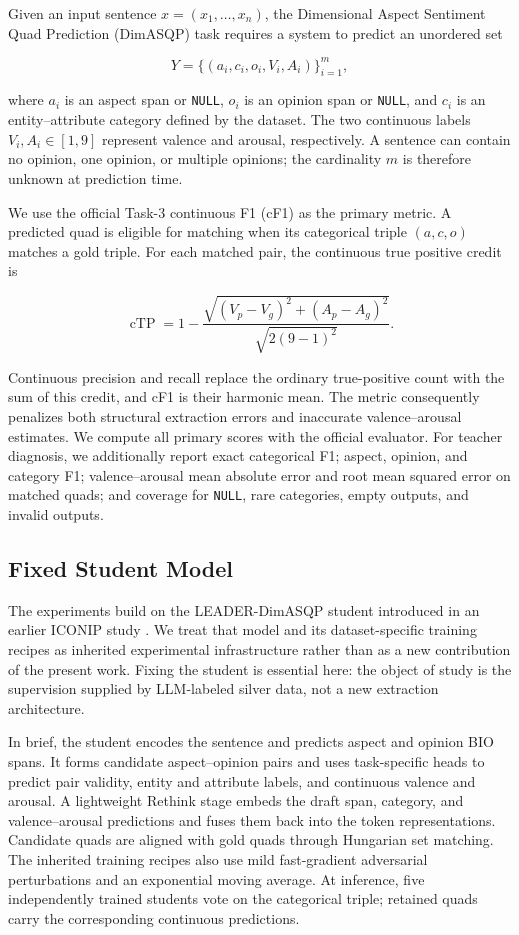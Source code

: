 Given an input sentence \(x=(x_1,\ldots,x_n)\), the Dimensional Aspect
Sentiment Quad Prediction (DimASQP) task requires a system to predict an
unordered set

\[
Y=\{(a_i,c_i,o_i,V_i,A_i)\}_{i=1}^{m},
\]

where \(a_i\) is an aspect span or \texttt{NULL}, \(o_i\) is an opinion
span or \texttt{NULL}, and \(c_i\) is an entity--attribute category
defined by the dataset. The two continuous labels \(V_i,A_i\in[1,9]\)
represent valence and arousal, respectively. A sentence can contain no
opinion, one opinion, or multiple opinions; the cardinality \(m\) is
therefore unknown at prediction time.
\citep{lee2026dimabsa,yu2026semeval}

We use the official Task-3 continuous F1 (cF1) as the primary metric. A
predicted quad is eligible for matching when its categorical triple
\((a,c,o)\) matches a gold triple. For each matched pair, the continuous
true positive credit is

\[
\operatorname{cTP}
=1-\frac{\sqrt{(V_p-V_g)^2+(A_p-A_g)^2}}{\sqrt{2(9-1)^2}}.
\]

Continuous precision and recall replace the ordinary true-positive count
with the sum of this credit, and cF1 is their harmonic mean. The metric
consequently penalizes both structural extraction errors and inaccurate
valence--arousal estimates. We compute all primary scores with the
official evaluator. For teacher diagnosis, we additionally report exact
categorical F1; aspect, opinion, and category F1; valence--arousal mean
absolute error and root mean squared error on matched quads; and
coverage for \texttt{NULL}, rare categories, empty outputs, and invalid
outputs.

\subsection{Fixed Student Model}\label{fixed-student-model}

The experiments build on the LEADER-DimASQP student introduced in an
earlier ICONIP study \citep{qin2026leader}. We treat that model and its
dataset-specific training recipes as inherited experimental
infrastructure rather than as a new contribution of the present work.
Fixing the student is essential here: the object of study is the
supervision supplied by LLM-labeled silver data, not a new extraction
architecture.

In brief, the student encodes the sentence and predicts aspect and
opinion BIO spans. It forms candidate aspect--opinion pairs and uses
task-specific heads to predict pair validity, entity and attribute
labels, and continuous valence and arousal. A lightweight Rethink stage
embeds the draft span, category, and valence--arousal predictions and
fuses them back into the token representations. Candidate quads are
aligned with gold quads through Hungarian set matching. The inherited
training recipes also use mild fast-gradient adversarial perturbations
and an exponential moving average. At inference, five independently
trained students vote on the categorical triple; retained quads carry
the corresponding continuous predictions.

